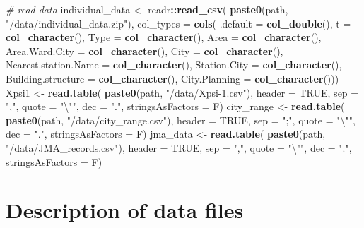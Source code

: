 \documentclass[
]{article}
\newenvironment{Shaded}{\begin{snugshade}}{\end{snugshade}}
\newcommand{\CharTok}[1]{\textcolor[rgb]{0.31,0.60,0.02}{#1}}
\newcommand{\CommentTok}[1]{\textcolor[rgb]{0.56,0.35,0.01}{\textit{#1}}}
\newcommand{\DataTypeTok}[1]{\textcolor[rgb]{0.13,0.29,0.53}{#1}}
\newcommand{\KeywordTok}[1]{\textcolor[rgb]{0.13,0.29,0.53}{\textbf{#1}}}
\newcommand{\NormalTok}[1]{#1}
\newcommand{\OperatorTok}[1]{\textcolor[rgb]{0.81,0.36,0.00}{\textbf{#1}}}
\newcommand{\OtherTok}[1]{\textcolor[rgb]{0.56,0.35,0.01}{#1}}
\newcommand{\StringTok}[1]{\textcolor[rgb]{0.31,0.60,0.02}{#1}}
\begin{document}
\begin{Shaded}
\begin{Highlighting}[]
\CommentTok{# read data}
\NormalTok{individual_data <-}
\StringTok{  }\NormalTok{readr}\OperatorTok{::}\KeywordTok{read_csv}\NormalTok{(}
    \KeywordTok{paste0}\NormalTok{(path, }\StringTok{"/data/individual_data.zip"}\NormalTok{),}
    \DataTypeTok{col_types =} \KeywordTok{cols}\NormalTok{(}
      \DataTypeTok{.default =} \KeywordTok{col_double}\NormalTok{(),}
      \DataTypeTok{t =} \KeywordTok{col_character}\NormalTok{(),}
      \DataTypeTok{Type =} \KeywordTok{col_character}\NormalTok{(),}
      \DataTypeTok{Area =} \KeywordTok{col_character}\NormalTok{(),}
      \DataTypeTok{Area.Ward.City =} \KeywordTok{col_character}\NormalTok{(),}
      \DataTypeTok{City =} \KeywordTok{col_character}\NormalTok{(),}
      \DataTypeTok{Nearest.station.Name =} \KeywordTok{col_character}\NormalTok{(),}
      \DataTypeTok{Station.City =} \KeywordTok{col_character}\NormalTok{(),}
      \DataTypeTok{Building.structure =} \KeywordTok{col_character}\NormalTok{(),}
      \DataTypeTok{City.Planning =} \KeywordTok{col_character}\NormalTok{()))}
\NormalTok{Xpsi1 <-}\StringTok{ }\KeywordTok{read.table}\NormalTok{(}
  \KeywordTok{paste0}\NormalTok{(path, }\StringTok{"/data/Xpsi-1.csv"}\NormalTok{),}
  \DataTypeTok{header =} \OtherTok{TRUE}\NormalTok{,}
  \DataTypeTok{sep =} \StringTok{","}\NormalTok{,}
  \DataTypeTok{quote =} \StringTok{"}\CharTok{\textbackslash{}"}\StringTok{"}\NormalTok{,}
  \DataTypeTok{dec =} \StringTok{"."}\NormalTok{,}
  \DataTypeTok{stringsAsFactors =}\NormalTok{ F)}
\NormalTok{city_range <-}\StringTok{ }\KeywordTok{read.table}\NormalTok{(}
  \KeywordTok{paste0}\NormalTok{(path, }\StringTok{"/data/city_range.csv"}\NormalTok{),}
  \DataTypeTok{header =} \OtherTok{TRUE}\NormalTok{,}
  \DataTypeTok{sep =} \StringTok{";"}\NormalTok{,}
  \DataTypeTok{quote =} \StringTok{"}\CharTok{\textbackslash{}"}\StringTok{"}\NormalTok{,}
  \DataTypeTok{dec =} \StringTok{"."}\NormalTok{,}
  \DataTypeTok{stringsAsFactors =}\NormalTok{ F)}
\NormalTok{jma_data <-}\StringTok{ }\KeywordTok{read.table}\NormalTok{(}
  \KeywordTok{paste0}\NormalTok{(path, }\StringTok{"/data/JMA_records.csv"}\NormalTok{),}
  \DataTypeTok{header =} \OtherTok{TRUE}\NormalTok{,}
  \DataTypeTok{sep =} \StringTok{","}\NormalTok{,}
  \DataTypeTok{quote =} \StringTok{"}\CharTok{\textbackslash{}"}\StringTok{"}\NormalTok{,}
  \DataTypeTok{dec =} \StringTok{"."}\NormalTok{,}
  \DataTypeTok{stringsAsFactors =}\NormalTok{ F)}
\end{Highlighting}
\end{Shaded}

\hypertarget{description-of-data-files}{%
\section{Description of data files}\label{description-of-data-files}}
\end{document}
